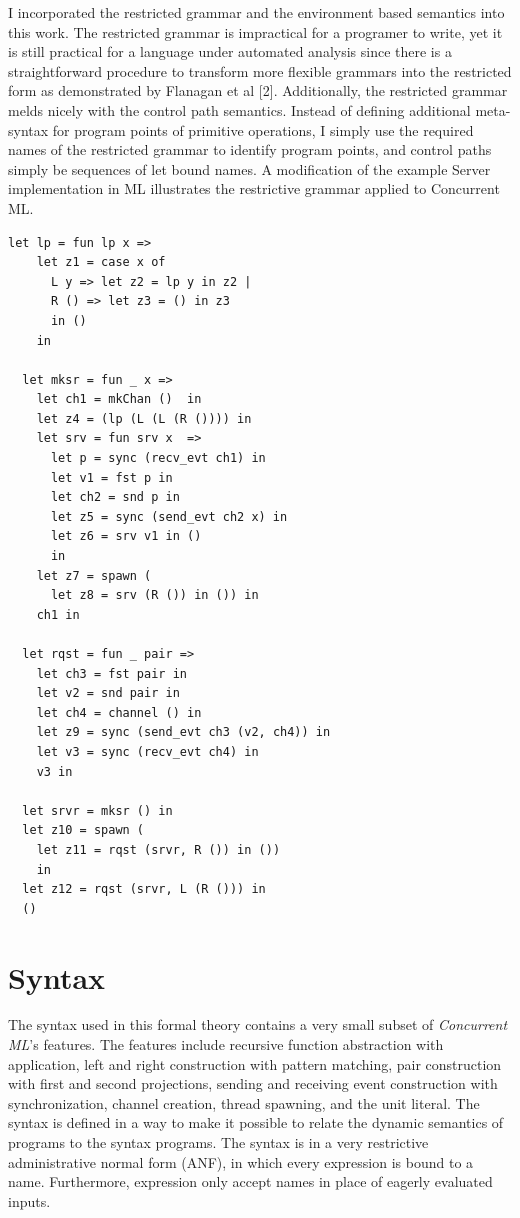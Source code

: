 \documentclass{article}
\begin{document}
I incorporated the restricted grammar and the environment based semantics into this work.
The restricted grammar is impractical for a programer to write, yet it is still practical for
a language under automated analysis since there is a straightforward procedure to transform
more flexible grammars into the restricted form as demonstrated by Flanagan et al [2].
Additionally, the restricted grammar melds nicely with the control path semantics.  Instead of
defining additional meta-syntax for program points of primitive operations, I simply use
the required names of the restricted grammar to identify program points, and control paths
simply be sequences of let bound names. A modification of the example Server
implementation in ML illustrates the restrictive grammar applied to Concurrent ML.

\begin{lstlisting}[language=logic, escapechar=\%]
  let lp = fun lp x => 
    let z1 = case x of 
      L y => let z2 = lp y in z2 |
      R () => let z3 = () in z3
      in ()
    in

  let mksr = fun _ x => 
    let ch1 = mkChan ()  in
    let z4 = (lp (L (L (R ()))) in
    let srv = fun srv x  =>
      let p = sync (recv_evt ch1) in
      let v1 = fst p in
      let ch2 = snd p in 
      let z5 = sync (send_evt ch2 x) in
      let z6 = srv v1 in ()
      in
    let z7 = spawn (
      let z8 = srv (R ()) in ()) in
    ch1 in

  let rqst = fun _ pair =>
    let ch3 = fst pair in
    let v2 = snd pair in
    let ch4 = channel () in
    let z9 = sync (send_evt ch3 (v2, ch4)) in
    let v3 = sync (recv_evt ch4) in
    v3 in

  let srvr = mksr () in
  let z10 = spawn ( 
    let z11 = rqst (srvr, R ()) in ())
    in
  let z12 = rqst (srvr, L (R ())) in
  () 
  \end{lstlisting}


\section{Syntax}
The syntax used in this formal theory contains a very small subset of
\textit{Concurrent ML}'s features. The features include recursive function abstraction with
application, left and right construction with pattern matching, pair construction with first
and second projections, sending and receiving event construction with synchronization,
channel creation, thread spawning, and the unit literal. The syntax is defined in a way to
make it possible to relate the dynamic semantics of programs to the syntax programs.
The syntax is in a very restrictive administrative normal form (ANF), in which every expression
is bound to a name. Furthermore, expression only accept names in place of eagerly evaluated
inputs. 
\end{document}

